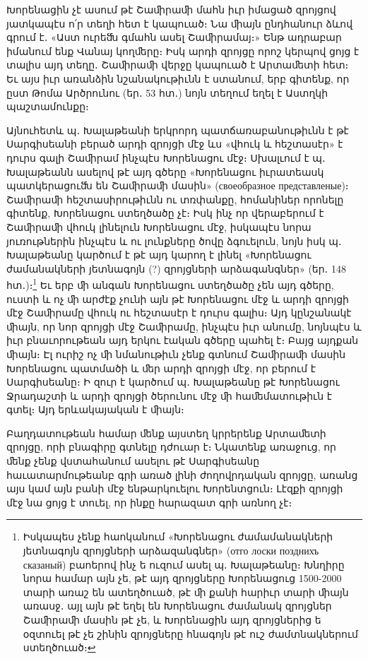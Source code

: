\documentclass{article}
\begin{document}
{Խորենացին չէ ասում թէ Շաﬕրաﬕ մահն իւր իմացած զրոյցով յատկապէս ո՛ր տեղի հետ է կապուած։ Նա ﬕայն ընդհանուր ձևով գրում է․ «Աստ ուրեﬓ գմահն ասել Շաﬕրամայ։» Ենթ ադրաբար իմանում ենք Վանայ կողﬔրը։ Իսկ արդի զրոյցը որոշ կերպով ցոյց է տալիս այդ տեղը․ Շաﬕրաﬕ վերջը կապուած է Արտաﬔտի հետ։ Եւ այս իւր առանձին նշանակութիւնն է ստանում, երբ գիտենք, որ ըստ Թոմա Արծրունու (եր․ 53 հտ․) նոյն տեղում եղել է Աստղկի պաշտամունքը։

Այնուհետև պ․ Խալաթեանի երկրորդ պատճառաբանութիւնն է թէ Սարգիսեանի բերած արդի զրոյցի մէջ ևս «վհուկ և հեշտասէր» է դուրս գալի Շաﬕրամ ինչպէս Խորենացու մէջ։ Սխալւում է պ․ Խալաթեանն ասելով թէ այդ գծերը «Խորենացու իւրատեասկ պատկերացուﬓ են Շաﬕրաﬕ մասին» (своеобразное представленые)։ Շաﬕրաﬕ հեշտասիրութիւնն ու տռփանքը, հոմանիներ որոնելը գիտենք, Խորենացու ստեղծածը չէ։ Իսկ ինչ որ վերաբերում է Շաﬕրաﬕ վհուկ լինելուն Խորենացու մէջ, իսկապէս նորա յուռութներին ինչպէս և ու լունքները ծովը ձգուելուն, նոյն իսկ պ․ Խալաթեանը կարծում է թէ այդ կարող է լինել «Խորենացու ժամանակների յետնագոյն (?) զրոյցների արձագանգներ» (եր․ 148 հտ․)։\footnote{Իսկապես չենք հաոկանում «Խորենացու ժամամանակների յետնագոյն զրոյցների արձազանգներ» (отго лоски позднихъ сказаный) բաոերով ինչ ե ուզում ասել պ․ Խալաթեանը։ Խնղիրը նորա համար այն չե, թէ այդ զրոյցները Խորենացուց 1500-2000 տարի առաշ են ատեղծուած, թէ ﬕ քանի հարիւր տարի ﬕայն առասջ․ այլ այն թէ եղել են Խորենացու ժամանակ զրոյցներ Շաﬕրաﬕ մասին թէ չե, և Խորենացին այդ զրոյցներից ե օզտուել թէ չե շինին զրոյցները հնագոյն թէ ուշ ժամտնակներում ստեղծուած։} Եւ երբ ﬕ անգան Խորենացու ստեղծածը չեն այդ գծերը, ուստի և ոչ ﬕ արժէք չունի այն թէ Խորենացու մէջ և արդի զրոյցի մէջ Շաﬕրամը վհուկ ու հեշտասէր է դուրս գալիս։ Այդ կընշանակէ ﬕայն, որ նոր զրոյցի մէջ Շաﬕրամը, ինչպէս իւր անումը, նոյնպէս և իւր բնաւորութեան այդ երկու էական գծերը պահել է։ Բայց այդքան ﬕայն։ Էլ ուրիշ ոչ ﬕ նմանութիւն չենք գտնում Շաﬕրաﬕ մասին Խորենացու պատմածի և ﬔր արդի զրոյցի մէջ, որ բերում է Սարգիսեանը։ Ի զուր է կարծում պ․ Խալաթեանը թէ Խորենացու Ջրադաշտի և արդի զրոյցի ծերունու մէջ ﬕ հաﬔմատութիւն է գտել։ Այդ երևակայական է ﬕայն։

Բաղդատութեան համար ﬔնք այստեղ կրրերենք Արտաﬔտի զրոյցը, որի բնագիրը գտնելը դժուար է։ Նկատենք առաջուց, որ ﬔնք չենք վստահանում ասելու թէ Սարգիսեանը հաւատարմութեանբ գրի առած լինի ժողովրդական զրոյցը, առանց այս կամ այն բանի մէջ ենթարկուելու Խորենտցուն։ Լէզքի զրոյցի մէջ նա ցոյց է տուել, որ ինքը հարազատ գրի առնող չէ։

}
\end{document}
